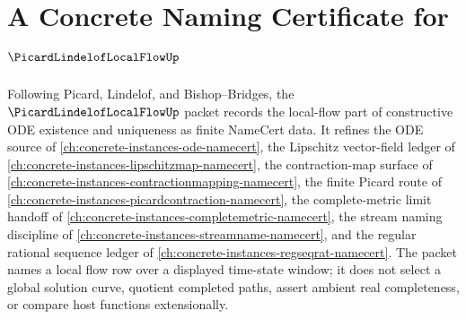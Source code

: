 \chapter{A Concrete Naming Certificate for $\PicardLindelofLocalFlowUp$}
\label{ch:concrete-instances-picard-lindelof-local-flow-namecert}

Following Picard, Lindelof, and Bishop--Bridges, the $\PicardLindelofLocalFlowUp$ packet records the local-flow part of constructive ODE existence and uniqueness as finite NameCert data. It refines the ODE source of \autoref{ch:concrete-instances-ode-namecert}, the Lipschitz vector-field ledger of \autoref{ch:concrete-instances-lipschitzmap-namecert}, the contraction-map surface of \autoref{ch:concrete-instances-contractionmapping-namecert}, the finite Picard route of \autoref{ch:concrete-instances-picardcontraction-namecert}, the complete-metric limit handoff of \autoref{ch:concrete-instances-completemetric-namecert}, the stream naming discipline of \autoref{ch:concrete-instances-streamname-namecert}, and the regular rational sequence ledger of \autoref{ch:concrete-instances-regseqrat-namecert}. The packet names a local flow row over a displayed time-state window; it does not select a global solution curve, quotient completed paths, assert ambient real completeness, or compare host functions extensionally.

